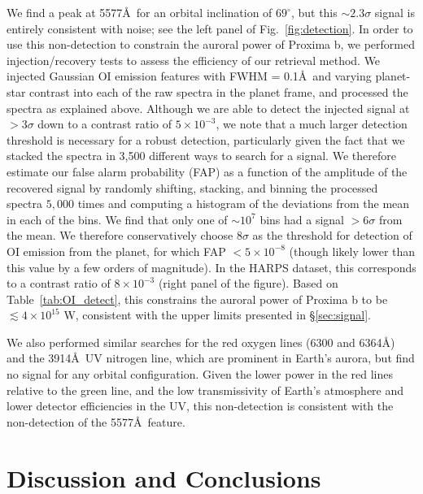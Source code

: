 \documentclass[apjl]{emulateapj}
\begin{document}
We find a peak at 5577\AA\ for an orbital inclination of $69^\circ$, but this ${\sim} 2.3 \sigma$ signal is entirely consistent with noise; see the left panel of Fig.~\ref{fig:detection}. In order to use this non-detection to constrain the auroral power of Proxima b, we performed injection/recovery tests to assess the efficiency of our retrieval method. We injected Gaussian OI emission features with FWHM = 0.1\AA\ and varying planet-star contrast into each of the raw spectra in the planet frame, and processed the spectra as explained above. Although we are able to detect the injected signal at $> 3\sigma$ down to a contrast ratio of $5\times 10^{-3}$, we note that a much larger detection threshold is necessary for a robust detection, particularly given the fact that we stacked the spectra in 3,500 different ways to search for a signal. We therefore estimate our false alarm probability (FAP) as a function of the amplitude of the recovered signal by randomly shifting, stacking, and binning the processed spectra $5,000$ times and computing a histogram of the deviations from the mean in each of the bins. We find that only one of ${\sim} 10^7$ bins had a signal $> 6\sigma$ from the mean. We therefore conservatively choose $8\sigma$ as the threshold for detection of OI emission from the planet, for which FAP $< 5\times 10^{-8}$ (though likely lower than this value by a few orders of magnitude). In the HARPS dataset, this corresponds to a contrast ratio of $8\times 10^{-3}$ (right panel of the figure). Based on Table~\ref{tab:OI_detect}, this constrains the auroral power of Proxima b to be $\lesssim 4\times 10^{15}$ W, consistent with the upper limits presented in \S\ref{sec:signal}.

We also performed similar searches for the red oxygen lines (6300 and 6364\AA) and the 3914\AA\ UV nitrogen line, which are prominent in Earth's aurora, but find no signal for any orbital configuration. Given the lower power in the red lines relative to the green line, and the low transmissivity of Earth's atmosphere and lower detector efficiencies in the UV, this non-detection is consistent with the non-detection of the 5577\AA\ feature.
  
\section{Discussion and Conclusions}
\label{sec:disc}
\end{document}
